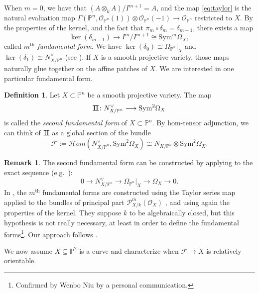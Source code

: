 \documentclass[12pt]{amsart}
\numberwithin{equation}{section}
\theoremstyle{plain}
\theoremstyle{definition}
\newtheorem{defn}[thm]{Definition}
\newtheorem{rem}[thm]{Remark}
\newcommand{\mb}[1]{\mathbb{#1}}
\newcommand{\mc}[1]{\mathcal{#1}}
\newcommand{\Hom}{\mathcal{H}om}
\newcommand{\Sym}{\mathrm{Sym}}
\newcommand{\II}{\sbox0{II}\dimen0=\dimexpr\wd0+1pt\relax
  \makebox[\dimen0]{\rlap{\vrule width\dimen0 height 0.07ex depth 0.07ex}%
    \rlap{\vrule width\dimen0 height\dimexpr\ht0+0.07ex\relax 
            depth\dimexpr-\ht0+0.07ex\relax}%
    \kern.5pt \textnormal{II}\kern.5pt}}
\begin{document}
When $m=0$, we have that $(A\otimes_k A)/I^{m+1}=A$, and the map \eqref{eq:taylor} is the natural evaluation map $\Gamma(\mathbb{P}^n, \mc{O}_{\mathbb{P}^n}(1))\otimes \mc{O}_{\mathbb{P}^n}(-1)\rightarrow \mc{O}_{\mathbb{P}^n}$ restricted to $X$. By the properties of the kernel, and the fact that $\pi_m \circ \delta_{m} = \delta_{m-1}$, there exists a map
\begin{equation}
    \ker(\delta_{m-1}) \longrightarrow I^m/I^{m+1}\cong \Sym^{m}\Omega_X,
\end{equation}
called \emph{$m^\mathrm{th}$ fundamental form}. We have $\ker(\delta_0)\cong \Omega_{\mathbb{P}^n}|_X$ and $\ker(\delta_1)\cong N^\vee_{X/\mb{P}^n}$ (see \cite[Theorem II.8.13 and Proposition II.8.12]{MR0463157}).  If $X$ is a smooth projective variety, those maps naturally glue together on the affine patches of $X$. We are interested in one particular fundamental form.
\begin{defn}
    Let $X\subset\mathbb{P}^n$ be a smooth projective variety. The map 
    \[\II\colon N^\vee_{X/\mb{P}^n}\longrightarrow\Sym^2\Omega_X\]
    is called the \emph{second fundamental form} of $X\subset\mb{P}^n$. By hom-tensor adjunction, we can think of $\II$ as a global section of the bundle 
    \[\mc{F}:=\Hom(N^\vee_{X/\mb{P}^n},\Sym^2\Omega_X)\cong N_{X/\mb{P}^n}\otimes\Sym^2\Omega_X.\]
\end{defn}
\begin{rem}
    The second fundamental form can be constructed by applying \cite[Section I.3]{MR274461} to the exact sequence (e.g.~\cite[Theorem II.8.17 (2)]{MR0463157}):
    \begin{equation}\label{eq:cotangent_seq}
    0\longrightarrow N^\vee_{X/\mb{P}^n}\longrightarrow\Omega_{\mb{P}^n}|_X\longrightarrow\Omega_X\longrightarrow 0.
    \end{equation}
    In \cite{einniu,MP24}, the $m^\mathrm{th}$ fundamental forms are constructed using the Taylor series map applied to the bundles of principal part $\mathcal{P}_{X/k}^m(\mathcal{O}_X)$ \cite[D\'efinition (16.3.6)]{MR238860}, and using again the properties of the kernel. They suppose $k$ to be algebraically closed, but this hypothesis is not really necessary, at least in order to define the fundamental forms\footnote{Confirmed by Wenbo Niu by a personal communication.}. Our approach follows \cite[Appendix A]{MR1308020}.
\end{rem}

We now assume $X\subseteq\mb{P}^2$ is a curve and characterize when $\mc{F}\to X$ is relatively orientable. 
\end{document}
